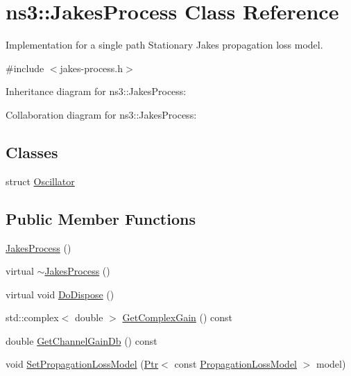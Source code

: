 \hypertarget{classns3_1_1JakesProcess}{}\section{ns3\+:\+:Jakes\+Process Class Reference}
\label{classns3_1_1JakesProcess}


Implementation for a single path Stationary Jakes propagation loss model.  




{\ttfamily \#include $<$jakes-\/process.\+h$>$}



Inheritance diagram for ns3\+:\+:Jakes\+Process\+:


Collaboration diagram for ns3\+:\+:Jakes\+Process\+:
\subsection*{Classes}
\begin{DoxyCompactItemize}
\item 
struct \hyperlink{structns3_1_1JakesProcess_1_1Oscillator}{Oscillator}
\end{DoxyCompactItemize}
\subsection*{Public Member Functions}
\begin{DoxyCompactItemize}
\item 
\hyperlink{classns3_1_1JakesProcess_a09be54eafd7e13b6dde28dae03f27a35}{Jakes\+Process} ()
\item 
virtual \hyperlink{classns3_1_1JakesProcess_a9e844216b7e61feddfdc1f9282682341}{$\sim$\+Jakes\+Process} ()
\item 
virtual void \hyperlink{classns3_1_1JakesProcess_ae929759b2f895aaf57e8a12b03a1503e}{Do\+Dispose} ()
\item 
std\+::complex$<$ double $>$ \hyperlink{classns3_1_1JakesProcess_a07f5c3d4ee540f7b9ba2369f1f5bbf26}{Get\+Complex\+Gain} () const 
\item 
double \hyperlink{classns3_1_1JakesProcess_a33038cb92b289b816b1c28e96a492530}{Get\+Channel\+Gain\+Db} () const 
\item 
void \hyperlink{classns3_1_1JakesProcess_afc7bbef31d5fa82a700d95c2691b7798}{Set\+Propagation\+Loss\+Model} (\hyperlink{classns3_1_1Ptr}{Ptr}$<$ const \hyperlink{classns3_1_1PropagationLossModel}{Propagation\+Loss\+Model} $>$ model)
\end{DoxyCompactItemize}
